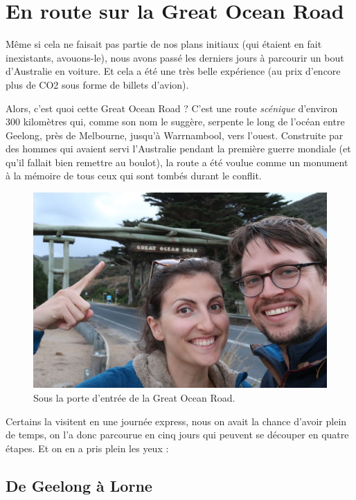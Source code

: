 \hypertarget{en-route-sur-la-great-ocean-road}{%
\section{En route sur la Great Ocean
Road}\label{en-route-sur-la-great-ocean-road}}

Même si cela ne faisait pas partie de nos plans initiaux (qui étaient en
fait inexistants, avouons-le), nous avons passé les derniers jours à
parcourir un bout d'Australie en voiture. Et cela a été une très belle
expérience (au prix d'encore plus de CO2 sous forme de billets d'avion).

Alors, c'est quoi cette Great Ocean Road ? C'est une route
\emph{scénique} d'environ 300 kilomètres qui, comme son nom le suggère,
serpente le long de l'océan entre Geelong, près de Melbourne, jusqu'à
Warrnambool, vers l'ouest. Construite par des hommes qui avaient servi
l'Australie pendant la première guerre mondiale (et qu'il fallait bien
remettre au boulot), la route a été voulue comme un monument à la
mémoire de tous ceux qui sont tombés durant le conflit.

\begin{figure}
\centering
\includegraphics{images/20180731_greatoceanroad.JPG}
\caption{Sous la porte d'entrée de la Great Ocean Road.}
\end{figure}

Certains la visitent en une journée express, nous on avait la chance
d'avoir plein de temps, on l'a donc parcourue en cinq jours qui peuvent
se découper en quatre étapes. Et on en a pris plein les yeux :

\hypertarget{mapid}{}

\hypertarget{de-geelong-uxe0-lorne}{%
\subsection{De Geelong à Lorne}\label{de-geelong-uxe0-lorne}}

